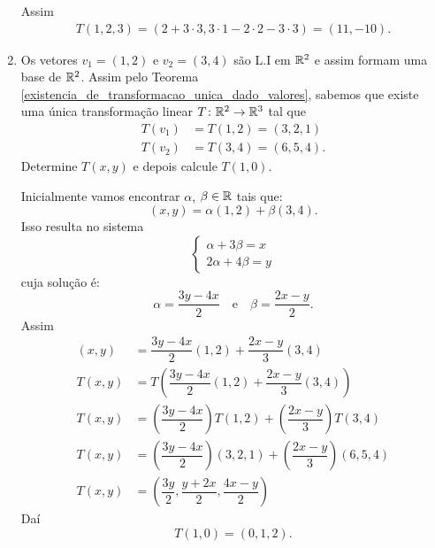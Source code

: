 \begin{exemplos}
\begin{enumerate}[label={\arabic*})]
\begin{solucao}
            Assim
            \begin{align*}
                T(1, 2, 3) = (2 + 3\cdot3, 3\cdot 1 - 2 \cdot 2 - 3 \cdot 3) = (11, -10).
            \end{align*}
        \end{solucao}
        \item Os vetores $v_1 = (1,2)$ e $v_2 = (3,4)$ são L.I em $\mathbb{R}^2$ e assim formam uma base de $\mathbb{R}^2$. Assim pelo Teorema \ref{existencia_de_transformacao_unica_dado_valores}, sabemos que existe uma única transformação linear $T \colon \mathbb{R}^2 \to \mathbb{R}^3$ tal que
        \begin{align*}
            T(v_1) &= T(1,2) = (3,2,1)\\
            T(v_2) &= T(3,4) = (6,5,4).
        \end{align*}
        Determine  $T(x, y)$ e depois calcule $T(1,0)$.
        \begin{solucao}
            Inicialmente vamos encontrar $\alpha$, $\beta \in \mathbb{R}$ tais que:
            \[
              (x, y) = \alpha(1,2) + \beta(3,4).
            \]
            Isso resulta no sistema
            \[
              \begin{cases}
                \alpha + 3\beta = x\\
                2\alpha + 4\beta = y
              \end{cases}
            \]
            cuja solução é:
            \[
              \alpha = \dfrac{3y - 4x}{2}\quad \mbox{e}\quad \beta = \dfrac{2x - y}{2}.
            \]
            Assim
            \begin{align*}
              (x, y) &= \dfrac{3y - 4x}{2}(1, 2) + \dfrac{2x - y}{3}(3, 4)\\
              T(x, y) &= T\left(\dfrac{3y - 4x}{2}(1, 2) + \dfrac{2x - y}{3}(3, 4)\right)\\
              T(x, y) &= \left(\dfrac{3y - 4x}{2}\right)T(1, 2) + \left(\dfrac{2x - y}{3}\right)T(3, 4)\\
              T(x, y) &= \left(\dfrac{3y - 4x}{2}\right)(3, 2, 1) + \left(\dfrac{2x - y}{3}\right)(6, 5, 4)\\
              T(x, y) &= \left(\dfrac{3y}{2}, \dfrac{y + 2x}{2}, \dfrac{4x - y}{2}\right)
            \end{align*}
            Daí
            \[
              T(1,0) =(0,1,2).
            \]
        \end{solucao}
    \end{enumerate}
\end{exemplos}

